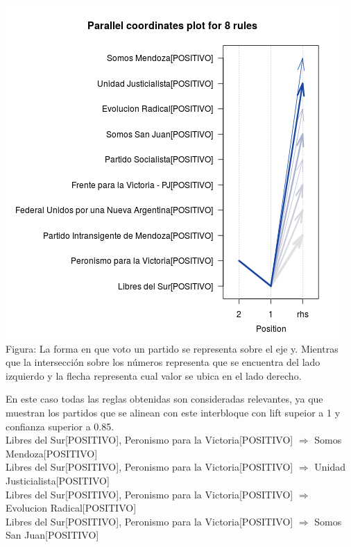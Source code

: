 \documentclass{endm}
\begin{document}
\begin{center}
\includegraphics[scale=0.4]{graficos/paracoordEnMarchaPartidos.png} \\
\scriptsize{Figura: La forma en que voto un partido se representa sobre el eje y. Mientras que la intersección sobre  los números representa que se encuentra del lado izquierdo y la flecha representa cual valor se ubica en el lado derecho.} \\
\end{center} 

En este caso todas las reglas obtenidas son consideradas relevantes, ya que muestran los partidos que se alinean con este interbloque con lift supeior a 1 y confianza superior a 0.85. \\

{Libres del Sur[POSITIVO], Peronismo para la Victoria[POSITIVO]} $\Longrightarrow$ {Somos Mendoza[POSITIVO]}  \\

{Libres del Sur[POSITIVO], Peronismo para la Victoria[POSITIVO]} $\Longrightarrow$ {Unidad Justicialista[POSITIVO]} \\

{Libres del Sur[POSITIVO], Peronismo para la Victoria[POSITIVO]} $\Longrightarrow$ {Evolucion Radical[POSITIVO]} \\

{Libres del Sur[POSITIVO], Peronismo para la Victoria[POSITIVO]} $\Longrightarrow$ {Somos San Juan[POSITIVO]} \\
\end{document}
